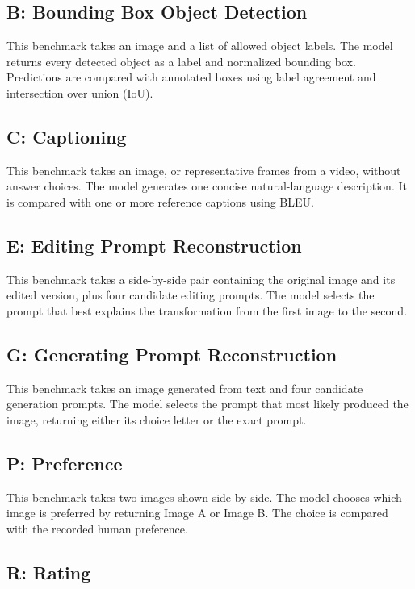 \documentclass{article}
\begin{document}
\subsection{\textbf{B}: Bounding Box Object Detection}

This benchmark takes an image and a list of allowed object labels. The model returns every detected object as a label and normalized bounding box. Predictions are compared with annotated boxes using label agreement and intersection over union (IoU).

\subsection{\textbf{C}: Captioning}

This benchmark takes an image, or representative frames from a video, without answer choices. The model generates one concise natural-language description. It is compared with one or more reference captions using BLEU.

\subsection{\textbf{E}: Editing Prompt Reconstruction}

This benchmark takes a side-by-side pair containing the original image and its edited version, plus four candidate editing prompts. The model selects the prompt that best explains the transformation from the first image to the second.

\subsection{\textbf{G}: Generating Prompt Reconstruction}

This benchmark takes an image generated from text and four candidate generation prompts. The model selects the prompt that most likely produced the image, returning either its choice letter or the exact prompt.

\subsection{\textbf{P}: Preference}

This benchmark takes two images shown side by side. The model chooses which image is preferred by returning Image A or Image B. The choice is compared with the recorded human preference.

\subsection{\textbf{R}: Rating}
\end{document}
